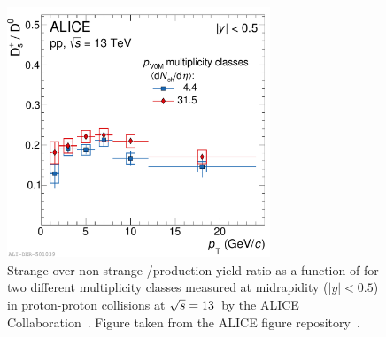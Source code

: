 \begin{figure}[tb]
    \centering
    \includegraphics[width=0.7\textwidth]{Figures/Chapter 9/DsD0Ratios_LowHighMult_V0M_Derived.pdf}
    \caption{Strange over non-strange \ds/\dz production-yield ratio as a function of \pt for two different multiplicity classes measured at midrapidity ($\lvert y\rvert<0.5$) in proton-proton collisions at $\sqrt{s}=13$~\tev by the ALICE Collaboration~\cite{ALICE:2021npz}. Figure taken from the ALICE figure repository~\cite{ALICE_figures}.}
    \label{fig:ALICE_DsD0VsMultiplicity}
\end{figure}

